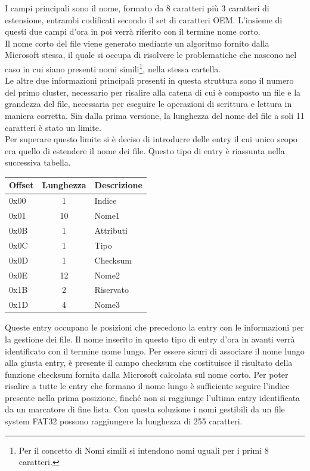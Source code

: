 I campi principali sono il nome, formato da 8 caratteri più 3 caratteri di estensione, entrambi codificati secondo il set di caratteri OEM. 
L'insieme di questi due campi d'ora in poi verrà riferito con il termine nome corto. \\
Il nome corto del file viene generato mediante un algoritmo fornito dalla Microsoft stessa, il quale si occupa di risolvere le problematiche che nascono nel caso in cui siano presenti nomi simili\footnote{Per il concetto di Nomi simili si intendono nomi uguali per i primi 8 caratteri.}, nella stessa cartella.\\
Le altre due informazioni principali presenti in questa struttura sono il numero del primo cluster, necessario per risalire alla catena di cui è composto un file e la grandezza del file, necessaria per 
eseguire le operazioni di scrittura e lettura in maniera corretta. 
Sin dalla prima versione, la lunghezza del nome del file a soli 11 caratteri è stato un limite.\\
Per superare questo limite si è deciso di introdurre delle entry il cui unico scopo era quello di estendere il nome dei file. Questo tipo di entry è riassunta nella successiva tabella.   

\begin{center}
\begin{tabular}{|l|c|l|}\hline
\textbf{Offset} & \textbf{Lunghezza} & \textbf{Descrizione}\\\hline
0x00 & 1  & Indice\\\hline
0x01 & 10 & Nome1\\\hline
0x0B & 1  & Attributi\\\hline
0x0C & 1  & Tipo\\\hline
0x0D & 1  & Checksum\\\hline
0x0E & 12 & Nome2\\\hline
0x1B & 2  & Riservato\\\hline
0x1D & 4  & Nome3\\\hline
\end{tabular}
\end{center}

Queste entry occupano le posizioni che precedono la entry con le informazioni per la gestione dei file. Il nome inserito in questo tipo di entry d'ora in avanti verrà identificato con il termine nome lungo.
Per essere sicuri di associare il nome lungo alla giusta entry, è presente il campo checksum che costituisce il risultato della funzione checksum fornita dalla Microsoft calcolata sul nome corto. 
Per poter risalire a tutte le entry che formano il nome lungo è sufficiente seguire l'indice presente nella prima posizione, finché non si raggiunge l'ultima entry identificata da un marcatore di fine lista.
Con questa soluzione i nomi gestibili da un file system FAT32 possono raggiungere la lunghezza di 255 caratteri. 

